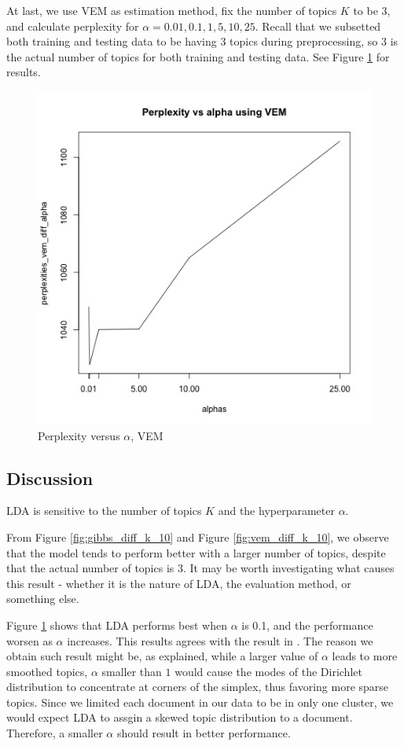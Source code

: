 \documentclass{article}
\begin{document}
At last, we use VEM as estimation method, fix the number of topics $K$ to be 3, and calculate perplexity for $\alpha = 0.01, 0.1, 1, 5, 10, 25$. Recall that we subsetted both training and testing data to be having 3 topics during preprocessing, so 3 is the actual number of topics for both training and testing data. See Figure \ref{fig:vem_diff_alpha} for results.

\begin{figure}[h]
  \centering
  \includegraphics[width=0.5\linewidth]{images/vem_diff_alpha.jpg}
  \caption{Perplexity versus $\alpha$, VEM}
  \label{fig:vem_diff_alpha}
\end{figure}


\subsection{Discussion}

LDA is sensitive to the number of topics $K$ and the hyperparameter $\alpha$.

From Figure \ref{fig:gibbs_diff_k_10} and Figure \ref{fig:vem_diff_k_10}, we observe that the model tends to perform better with a larger number of topics, despite that the actual number of topics is 3. It may be worth investigating what causes this result - whether it is the nature of LDA, the evaluation method, or something else.

Figure \ref{fig:vem_diff_alpha} shows that LDA performs best when $\alpha$ is 0.1, and the performance worsen as $\alpha$ increases. This results agrees with the result in \cite{lu2011investigating}. The reason we obtain such result might be, as \cite{lu2011investigating} explained, while a larger value of $\alpha$ leads to more smoothed topics, $\alpha$ smaller than $1$ would cause the modes of the Dirichlet distribution to concentrate at corners of the simplex, thus favoring more sparse topics. Since we limited each document in our data to be in only one cluster, we would expect LDA to assgin a skewed topic distribution to a document. Therefore, a smaller $\alpha$ should result in better performance.
\end{document}
